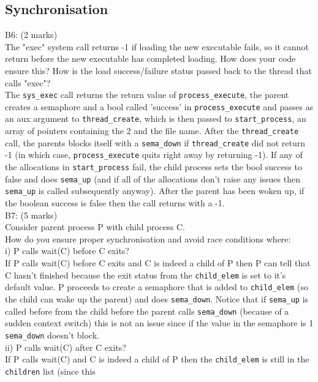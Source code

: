 \documentclass[11pt, a4paper]{article}
\begin{document}
\subsection{Synchronisation}
B6: (2 marks)\\
The "exec" system call returns -1 if loading the new executable fails,
so it cannot return before the new executable has completed loading. 
How does your code ensure this? How is the load success/failure
status passed back to the thread that calls "exec"?\bigskip\\
The \verb|sys_exec| call returns the return value of \verb|process_execute|, 
the parent creates a semaphore and a bool called 'success' in \verb|process_execute|
and passes as an aux argument to \verb|thread_create|, which is then passed
to \verb|start_process|, an array of pointers containing the 2 and the file name.
After the \verb|thread_create| call, the parents blocks itself with a \verb|sema_down|
if \verb|thread_create| did not return -1 (in which case, \verb|process_execute|
quits right away by returning -1).
If any of the allocations in \verb|start_process| fail, the child process sets
the bool success to false and does \verb|sema_up| (and if all of the allocations don't
raise any issues then \verb|sema_up| is called subsequently anyway). After the parent
has been woken up, if the boolean success is false then the call returns with a -1.\bigskip\\
B7: (5 marks)\\
Consider parent process P with child process C.\\
How do you ensure proper synchronisation and avoid race conditions where:\bigskip\\
i)   P calls wait(C) before C exits?\\
If P calls wait(C) before C exits and C is indeed a child of P then
P can tell that C hasn't finished because the exit status from the
\verb|child_elem| is set to it's default value. P proceeds to
create a semaphore that is added to \verb|child_elem| 
(so the child can wake up the parent) and
does \verb|sema_down|. Notice that if \verb|sema_up| is called
before from the child before the parent calls \verb|sema_down| (because
of a sudden context switch) this is not an issue since if the value
in the semaphore is 1 \verb|sema_down| doesn't block.\bigskip\\
ii)  P calls wait(C) after C exits?\\
If P calls wait(C) and C is indeed a child of P then the
\verb|child_elem| is still in the \verb|children| list (since this
\end{document}
